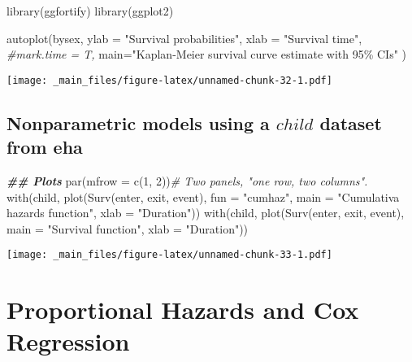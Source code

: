 \documentclass[
]{book}
\newenvironment{Shaded}{\begin{snugshade}}{\end{snugshade}}
\newcommand{\AttributeTok}[1]{\textcolor[rgb]{0.77,0.63,0.00}{#1}}
\newcommand{\CommentTok}[1]{\textcolor[rgb]{0.56,0.35,0.01}{\textit{#1}}}
\newcommand{\DecValTok}[1]{\textcolor[rgb]{0.00,0.00,0.81}{#1}}
\newcommand{\DocumentationTok}[1]{\textcolor[rgb]{0.56,0.35,0.01}{\textbf{\textit{#1}}}}
\newcommand{\FunctionTok}[1]{\textcolor[rgb]{0.00,0.00,0.00}{#1}}
\newcommand{\NormalTok}[1]{#1}
\newcommand{\StringTok}[1]{\textcolor[rgb]{0.31,0.60,0.02}{#1}}
\begin{document}
\begin{Shaded}
\begin{Highlighting}[]
\FunctionTok{library}\NormalTok{(ggfortify)}
\FunctionTok{library}\NormalTok{(ggplot2)}

\FunctionTok{autoplot}\NormalTok{(bysex,}
     \AttributeTok{ylab =} \StringTok{"Survival probabilities"}\NormalTok{,}
     \AttributeTok{xlab =} \StringTok{"Survival time"}\NormalTok{,}
     \CommentTok{\#mark.time = T,}
     \AttributeTok{main=}\StringTok{"Kaplan{-}Meier survival curve estimate with 95\% CIs"}
\NormalTok{     )}
\end{Highlighting}
\end{Shaded}

\texttt{[image: \_main\_files/figure-latex/unnamed-chunk-32-1.pdf]}

\hypertarget{nonparametric-models-using-a-child-dataset-from-eha}{%
\subsection{\texorpdfstring{Nonparametric models using a \(child\) dataset from eha}{Nonparametric models using a child dataset from eha}}\label{nonparametric-models-using-a-child-dataset-from-eha}}

\begin{Shaded}
\begin{Highlighting}[]
\DocumentationTok{\#\# Plots}
\FunctionTok{par}\NormalTok{(}\AttributeTok{mfrow =} \FunctionTok{c}\NormalTok{(}\DecValTok{1}\NormalTok{, }\DecValTok{2}\NormalTok{))}\CommentTok{\# Two panels, "one row, two columns".}
\FunctionTok{with}\NormalTok{(child, }\FunctionTok{plot}\NormalTok{(}\FunctionTok{Surv}\NormalTok{(enter, exit, event), }\AttributeTok{fun =} \StringTok{"cumhaz"}\NormalTok{, }
                \AttributeTok{main =} \StringTok{"Cumulativa hazards function"}\NormalTok{,}
                \AttributeTok{xlab =} \StringTok{"Duration"}\NormalTok{))}
\FunctionTok{with}\NormalTok{(child, }\FunctionTok{plot}\NormalTok{(}\FunctionTok{Surv}\NormalTok{(enter, exit, event),}
                \AttributeTok{main =} \StringTok{"Survival function"}\NormalTok{,}
                \AttributeTok{xlab =} \StringTok{"Duration"}\NormalTok{))}
\end{Highlighting}
\end{Shaded}

\texttt{[image: \_main\_files/figure-latex/unnamed-chunk-33-1.pdf]}

\hypertarget{proportional-hazards-and-cox-regression}{%
\section{Proportional Hazards and Cox Regression}\label{proportional-hazards-and-cox-regression}}
\end{document}
